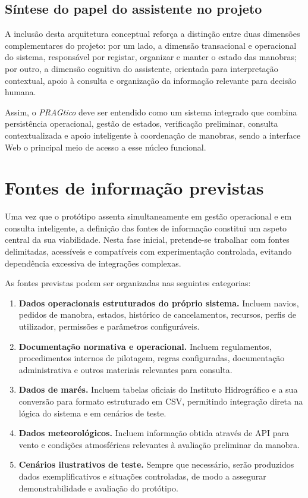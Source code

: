 \documentclass[a4paper,12pt]{report}
\begin{document}
\subsection{Síntese do papel do assistente no projeto}

A inclusão desta arquitetura conceptual reforça a distinção entre duas dimensões complementares do projeto: por um lado, a dimensão transacional e operacional do sistema, responsável por registar, organizar e manter o estado das manobras; por outro, a dimensão cognitiva do assistente, orientada para interpretação contextual, apoio à consulta e organização da informação relevante para decisão humana.

Assim, o \textit{PRAGtico} deve ser entendido como um sistema integrado que combina persistência operacional, gestão de estados, verificação preliminar, consulta contextualizada e apoio inteligente à coordenação de manobras, sendo a interface Web o principal meio de acesso a esse núcleo funcional.

\section{Fontes de informação previstas}

Uma vez que o protótipo assenta simultaneamente em gestão operacional e em consulta inteligente, a definição das fontes de informação constitui um aspeto central da sua viabilidade. Nesta fase inicial, pretende-se trabalhar com fontes delimitadas, acessíveis e compatíveis com experimentação controlada, evitando dependência excessiva de integrações complexas.

As fontes previstas podem ser organizadas nas seguintes categorias:

\begin{enumerate}[label=\arabic*.]
    \item \textbf{Dados operacionais estruturados do próprio sistema.} Incluem navios, pedidos de manobra, estados, histórico de cancelamentos, recursos, perfis de utilizador, permissões e parâmetros configuráveis.
    \item \textbf{Documentação normativa e operacional.} Incluem regulamentos, procedimentos internos de pilotagem, regras configuradas, documentação administrativa e outros materiais relevantes para consulta.
    \item \textbf{Dados de marés.} Incluem tabelas oficiais do Instituto Hidrográfico e a sua conversão para formato estruturado em CSV, permitindo integração direta na lógica do sistema e em cenários de teste.
    \item \textbf{Dados meteorológicos.} Incluem informação obtida através de API para vento e condições atmosféricas relevantes à avaliação preliminar da manobra.
    \item \textbf{Cenários ilustrativos de teste.} Sempre que necessário, serão produzidos dados exemplificativos e situações controladas, de modo a assegurar demonstrabilidade e avaliação do protótipo.
\end{enumerate}
\end{document}
